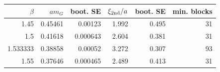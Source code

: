 \begin{tabular}{rrrrrr}
\toprule
$\beta$ & $am_G$ & boot. SE & $\xi_{\rm 2nd}/a$ & boot. SE & min. blocks\\\midrule
1.45 & 0.45461 & 0.00123 & 1.992 & 0.495 & 31\\
1.5 & 0.41618 & 0.000643 & 2.604 & 0.381 & 31\\
1.533333 & 0.38858 & 0.00052 & 3.272 & 0.307 & 93\\
1.55 & 0.37646 & 0.000465 & 2.489 & 0.413 & 31\\
\bottomrule
\end{tabular}
